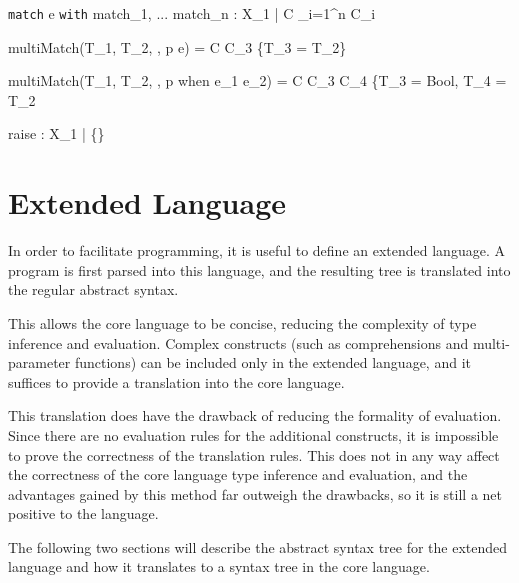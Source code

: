 \documentclass{article}
\begin{document}
\bigskip

    {\Gamma \vdash \texttt{match} \; e \; \texttt{with} \; match_1, ... \; match_n : X_1 \; | \; C \cup \displaystyle \bigcup_{i=1}^{n} C_i}

\medskip

  {multiMatch(T_1, T_2, \Gamma, p \rightarrow e) = C \cup C_3 \cup \{T_3 = T_2\}}

  {multiMatch(T_1, T_2, \Gamma, p \; \mbox{when} \; e_1 \rightarrow e_2) = C \cup C_3 \cup C_4 \cup \{T_3 = Bool, T_4 = T_2}


\bigskip

    {\Gamma \vdash raise : X_1 \; | \; \{\}}

\newpage

\section{Extended Language}

In order to facilitate programming, it is useful to define an extended language.
A program is first parsed into this language, and the resulting tree is translated into the regular abstract syntax.

This allows the core language to be concise, reducing the complexity of type inference and evaluation.
Complex constructs (such as comprehensions and multi-parameter functions) can be included only in the extended language, and it suffices to provide a translation into the core language.

This translation does have the drawback of reducing the formality of evaluation.
Since there are no evaluation rules for the additional constructs, it is impossible to prove the correctness of the translation rules.
This does not in any way affect the correctness of the core language type inference and evaluation, and the advantages gained by this method far outweigh the drawbacks, so it is still a net positive to the language.

\medskip

The following two sections will describe the abstract syntax tree for the extended language and how it translates to a syntax tree in the core language.
\end{document}
